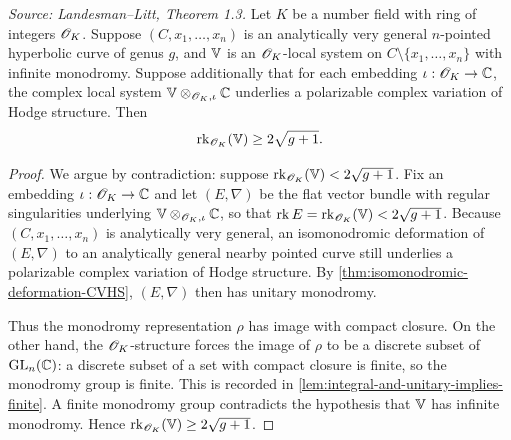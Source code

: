 \begin{theorem}
  \label{thm:very-general-VHS}
  \textit{Source: Landesman--Litt, Theorem 1.3.}
  Let $K$ be a number field with ring of integers $\mathscr{O}_K$. Suppose
  $(C, x_1, \ldots, x_n)$ is an analytically very general $n$-pointed hyperbolic
  curve of genus $g$, and $\mathbb{V}$ is an $\mathscr{O}_K$-local system on
  $C \setminus \{x_1, \ldots, x_n\}$ with infinite monodromy. Suppose
  additionally that for each embedding $\iota : \mathscr{O}_K \to \mathbb{C}$, the complex local
  system $\mathbb{V} \otimes_{\mathscr{O}_K, \iota} \mathbb{C}$ underlies a polarizable complex
  variation of Hodge structure. Then
  \[
    \operatorname{rk}_{\mathscr{O}_K}(\mathbb{V}) \ge 2\sqrt{g+1}.
  \]
\end{theorem}

\begin{proof}
  We argue by contradiction: suppose $\operatorname{rk}_{\mathscr{O}_K}(\mathbb{V}) < 2\sqrt{g+1}$. Fix an
  embedding $\iota : \mathscr{O}_K \to \mathbb{C}$ and let $(E, \nabla)$ be the flat vector bundle
  with regular singularities underlying $\mathbb{V} \otimes_{\mathscr{O}_K, \iota} \mathbb{C}$, so that
  $\operatorname{rk} E = \operatorname{rk}_{\mathscr{O}_K}(\mathbb{V}) < 2\sqrt{g+1}$. Because $(C, x_1, \ldots, x_n)$ is
  analytically very general, an isomonodromic deformation of $(E, \nabla)$ to an
  analytically general nearby pointed curve still underlies a polarizable complex
  variation of Hodge structure. By \cref{thm:isomonodromic-deformation-CVHS},
  $(E, \nabla)$ then has unitary monodromy.

  Thus the monodromy representation $\rho$ has image with compact closure. On the
  other hand, the $\mathscr{O}_K$-structure forces the image of $\rho$ to be a discrete
  subset of $\operatorname{GL}_n(\mathbb{C})$: a discrete subset of a set with compact closure is
  finite, so the monodromy group is finite. This is recorded in
  \cref{lem:integral-and-unitary-implies-finite}. A finite monodromy group
  contradicts the hypothesis that $\mathbb{V}$ has infinite monodromy. Hence
  $\operatorname{rk}_{\mathscr{O}_K}(\mathbb{V}) \ge 2\sqrt{g+1}$.
\end{proof}

